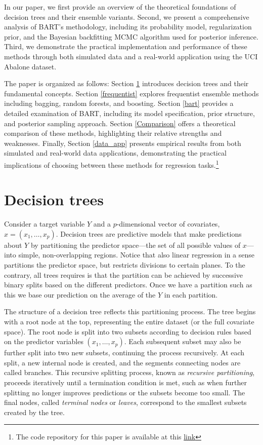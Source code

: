 \documentclass[a4paper,11pt]{article}
\begin{document}
In our paper, we first provide an overview of the theoretical foundations of decision trees and their ensemble variants. Second, we present a comprehensive analysis of BART's methodology, including its probability model, regularization prior, and the Bayesian backfitting MCMC algorithm used for posterior inference. Third, we demonstrate the practical implementation and performance of these methods through both simulated data and a real-world application using the UCI Abalone dataset.

The paper is organized as follows: Section \ref{decision} introduces decision trees and their fundamental concepts. Section \ref{frequentist} explores frequentist ensemble methods including bagging, random forests, and boosting. Section \ref{bart} provides a detailed examination of BART, including its model specification, prior structure, and posterior sampling approach. Section \ref{Comparison} offers a theoretical comparison of these methods, highlighting their relative strengths and weaknesses. Finally, Section \ref{data_app} presents empirical results from both simulated and real-world data applications, demonstrating the practical implications of choosing between these methods for regression tasks.\footnote{The code repository for this paper is available at this \href{https://github.com/giuliofrey/bart}{link}}


\section{Decision trees}
\label{decision}

Consider a target variable \( Y \) and a \( p \)-dimensional vector of covariates, \( x = (x_1, \ldots, x_p) \). Decision trees are predictive models that make predictions about \( Y \) by partitioning the predictor space—the set of all possible values of \( x \)—into simple, non-overlapping regions. Notice that also linear
regression in a sense partitions the predictor space, but restricts divisions to certain planes. To the contrary, all trees requires is that the partition can be achieved by successive binary splits based on the different predictors. Once we have a partition such as this we base our prediction on the average of the $Y$ in each partition. 

The structure of a decision tree reflects this partitioning process. The tree begins with a root node at the top, representing the entire dataset (or the full covariate space). The root node is split into two subsets according to decision rules based on the predictor variables \( (x_1, \ldots, x_p) \). Each subsequent subset may also be further split into two new subsets, continuing the process recursively. At each split, a new internal node is created, and the segments connecting nodes are called branches. This recursive splitting process, known as \textit{recursive partitioning}, proceeds iteratively until a termination condition is met, such as when further splitting no longer improves predictions or the subsets become too small. The final nodes, called \textit{terminal nodes} or \textit{leaves}, correspond to the smallest subsets created by the tree.
\end{document}
